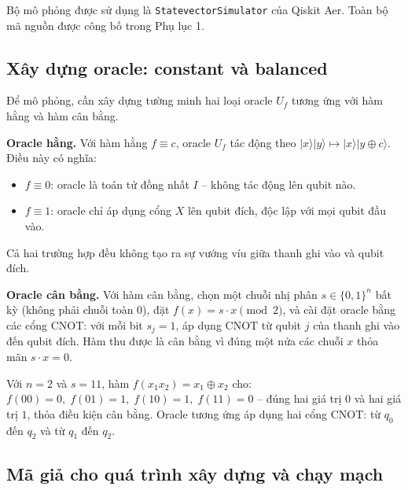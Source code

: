 Bộ mô phỏng được sử dụng là \texttt{StatevectorSimulator} của Qiskit Aer.
Toàn bộ mã nguồn được công bố trong
Phụ lục 1.

\subsection*{Xây dựng oracle: constant và balanced}

Để mô phỏng, cần xây dựng tường minh hai loại oracle $U_f$ tương ứng với
hàm hằng và hàm cân bằng.

\textbf{Oracle hằng.} Với hàm hằng $f \equiv c$, oracle $U_f$ tác động theo
$|x\rangle|y\rangle \mapsto |x\rangle|y \oplus c\rangle$. Điều này có nghĩa:
\begin{itemize}
    \item $f \equiv 0$: oracle là toán tử đồng nhất $I$ -- không tác động
          lên qubit nào.
    \item $f \equiv 1$: oracle chỉ áp dụng cổng $X$ lên qubit đích, độc lập
          với mọi qubit đầu vào.
\end{itemize}
Cả hai trường hợp đều không tạo ra sự vướng víu giữa thanh ghi vào và
qubit đích.

\textbf{Oracle cân bằng.} Với hàm cân bằng, chọn một chuỗi nhị phân $s \in \{0,1\}^n$ bất kỳ (không phải chuỗi
toàn $0$), đặt $f(x) = s \cdot x \pmod{2}$, và cài đặt oracle bằng các
cổng CNOT: với mỗi bit $s_j = 1$, áp dụng $\mathrm{CNOT}$ từ qubit $j$
của thanh ghi vào đến qubit đích. Hàm thu được là cân bằng vì đúng một
nửa các chuỗi $x$ thỏa mãn $s \cdot x = 0$.

\begin{example}[Oracle cân bằng với $n=2$, $s=11$]
\label{ex:oracle-balanced-n2}
Với $n=2$ và $s=11$, hàm $f(x_1 x_2) = x_1 \oplus x_2$ cho:
$f(00)=0,\; f(01)=1,\; f(10)=1,\; f(11)=0$ -- đúng hai giá trị $0$ và
hai giá trị $1$, thỏa điều kiện cân bằng. Oracle tương ứng áp dụng hai
cổng CNOT: từ $q_0$ đến $q_2$ và từ $q_1$ đến $q_2$.
\end{example}

\subsection*{Mã giả cho quá trình xây dựng và chạy mạch}

